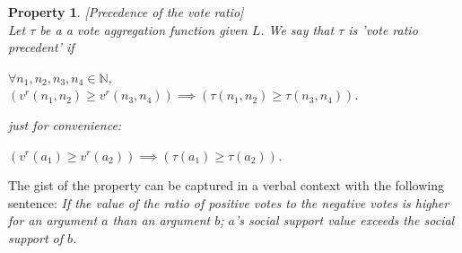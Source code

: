 \documentclass{article}
\newtheorem{property}{Property}
\newtheorem{conjecture}{Conjecture}
\newcommand{\nat}{\mathbb{N}}   %
\newcommand{\valueset}{L}
\begin{document}
\begin{property}
\label{P2}[Precedence of the vote ratio]\\
Let $\tau$ be a a vote aggregation function given $\valueset$. We say that $\tau$ is 'vote ratio precedent' if
\begin{center}
$\forall n_1, n_2, n_3, n_4 \in \nat$,  \\
$\left( v^{r}(n_{1}, n_{2}) \ge v^{r}(n_{3}, n_{4}) \right) \implies \left( \tau(n_{1}, n_{2}) \ge \tau(n_{3}, n_{4}) \right)$. \\

{\color{teal}
just for convenience:

 $\left( v^{r}(a_{1}) \ge v^{r}(a_{2}) \right) \implies \left( \tau(a_1) \ge \tau(a_2) \right)$. 
}
\end{center}

\end{property}

The gist of the property can be captured in a verbal context with the following sentence: \emph{If the value of the ratio of positive votes to the negative votes is higher for an argument $a$ than an argument $b$; $a$'s social support value exceeds the social support of $b$.}  \\

\begin{comment}
\begin{conjecture}
Vote Aggregation function enjoys Property \ref{P2}.
\end{conjecture}

\begin{proof}  [Sketch of proof] It should suffice to show that:
\\
For two arbitrary tuples $(v^+_1, v^-_1)$ and $(v^+_2, v^-_2)$, if $\frac{v^+_1} {v^-_1} \ge \frac{v^+_2} {v^-_2}$ then $\tau(v^+_1, v^-_1, v_{max}) \ge \tau(v^+_2, v^-_2, v_{max})$. 

\end{proof}


As an example for  $(v^+_1, v^-_1) = (10,0)$ and $(v^+_2, v^-_2) = (999,1)$, $v_{max} = 1000$ and $\tau(v^+_1, v^-_1, v_{max}) = 0.9999$ and  $\tau(v^+_2, v^-_2, v_{max}) = 0.9989$.
\end{comment}
\end{document}
